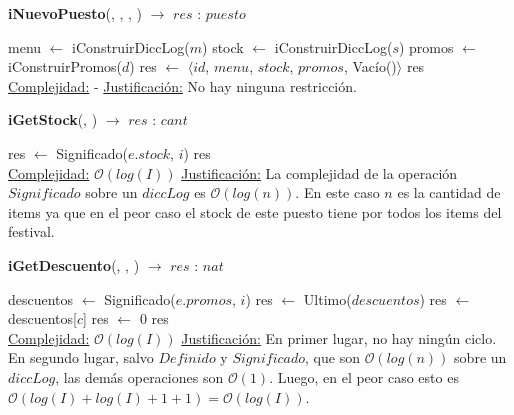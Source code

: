 \begin{Algoritmos}
    

    \begin{algorithm}
    \caption{\textbf{iNuevoPuesto}(, , , ) $\to$ $res$ : $puesto$}
    \begin{algorithmic}
        \State menu $\gets$ iConstruirDiccLog($m$)
        \State stock $\gets$ iConstruirDiccLog($s$)
        \State promos $\gets$ iConstruirPromos($d$)
        \State res $\gets$ $\langle$$id$, $menu$, $stock$, $promos$, Vacío()$\rangle$
        \State \Return res
        \\
        \Statex \underline{Complejidad:} -
        \Statex \underline{Justificación:} No hay ninguna restricción.
    \end{algorithmic}
    \end{algorithm}

    \begin{algorithm}
    \caption{\textbf{iGetStock}(, ) $\to$ $res$ : $cant$}
    \begin{algorithmic}
        \State res $\gets$ Significado($e.stock$, $i$)
        \State \Return res
        \\
        \Statex \underline{Complejidad:} $\mathcal{O}(log(I))$
        \Statex \underline{Justificación:} La complejidad de la operación $Significado$ sobre un $diccLog$ es $\mathcal{O}(log(n))$. En este caso $n$ es la cantidad de items ya que en el peor caso el stock de este puesto tiene por todos los items del festival.
    \end{algorithmic}
    \end{algorithm}

    \begin{algorithm}
    \caption{\textbf{iGetDescuento}(, , ) $\to$ $res$ : $nat$}
    \begin{algorithmic}
      
        \State descuentos $\gets$ Significado($e.promos$, $i$)  
          
            \State res $\gets$ Ultimo($descuentos$)  
        \Else
            \State res $\gets$ descuentos[$c$]  
        \EndIf
    \Else
        \State res $\gets$ 0  
    \EndIf
    \State \Return res
    \\
    \Statex \underline{Complejidad:} $\mathcal{O}(log(I))$
    \Statex \underline{Justificación:} En primer lugar, no hay ningún ciclo. En segundo lugar, salvo $Definido$ y $Significado$, que son $\mathcal{O}(log(n))$ sobre un $diccLog$, las demás operaciones son $\mathcal{O}(1)$. Luego, en el peor caso esto es $\mathcal{O}(log(I) + log(I) + 1 + 1) = \mathcal{O}(log(I))$.
    \end{algorithmic}
    \end{algorithm}


\end{Algoritmos}
